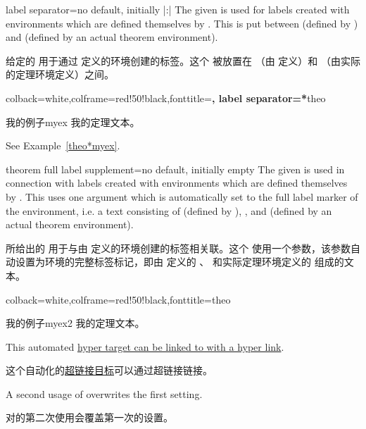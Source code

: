 \begin{docTcbKey}[][doc new=2016-04-19]{label separator}{=}{no default, initially |:|}
The given  is used for labels created with environments which
are defined themselves by . This  is
put between  (defined by )
and  (defined by an actual theorem environment).

给定的  用于通过  定义的环境创建的标签。这个  被放置在 （由  定义）和 （由实际的定理环境定义）之间。
\begin{dispExample}
%
  {colback=white,colframe=red!50!black,fonttitle=\bfseries,
   label separator=*}{theo}
\begin{sometheorem}{我的例子}{myex}
我的定理文本。
\end{sometheorem}
See Example~\ref{theo*myex}.
\end{dispExample}
\end{docTcbKey}



\begin{docTcbKey}[][doc new=2018-01-12]{theorem full label supplement}{=}{no default, initially empty}
The given  is used in connection with labels created with environments which
are defined themselves by .
This  uses one argument which is automatically set to the
full label marker of the environment, i.e. a text consisting of
 (defined by ),
,
and  (defined by an actual theorem environment).

所给出的  用于与由  定义的环境创建的标签相关联。这个  使用一个参数，该参数自动设置为环境的完整标签标记，即由  定义的 、 和实际定理环境定义的  组成的文本。
\begin{dispExample}

%
   {colback=white,colframe=red!50!black,fonttitle=\bfseries}{theo}
\begin{sometheorem}{我的例子}{myex2}
我的定理文本。
\end{sometheorem}
This automated \hyperlink{theo:myex2}{hyper target can be linked to with a
 hyper link}.

这个自动化的\hyperlink{theo:myex2}{超链接目标}可以通过超链接链接。
\end{dispExample}

A second usage of  overwrites
the first setting.

对的第二次使用会覆盖第一次的设置。
\end{docTcbKey}


